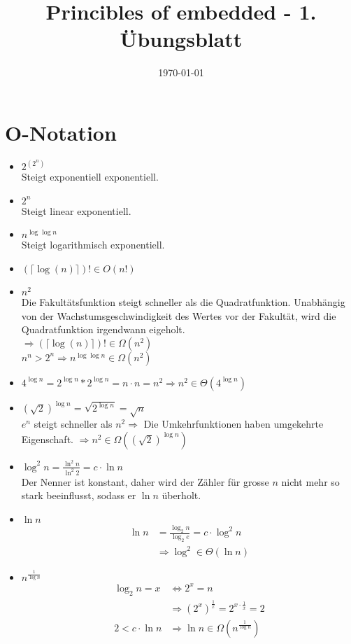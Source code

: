 \documentclass[a4paper,10pt]{scrartcl}
\title{Princibles of embedded  - 1. \"Ubungsblatt}
\author{\Authors}
\date{\today}
\begin{document}
\maketitle

\section{$\boldsymbol{O}$-Notation}
\begin{itemize}
	\item $2^{(2^n)}$\\
		Steigt exponentiell exponentiell.
	\item $2^n$\\
		Steigt linear exponentiell.
	\item $n^{\log \log n}$\\
		Steigt logarithmisch exponentiell.
	\item $(\lceil \log (n) \rceil )! \in O(n!)$
	\item $n^2$\\
		Die Fakult\"atsfunktion steigt schneller als die Quadratfunktion. Unabh\"angig von der Wachstumsgeschwindigkeit des Wertes vor der Fakult\"at, wird die Quadratfunktion irgendwann eigeholt.\\
		$\Rightarrow  (\lceil \log (n) \rceil )! \in \Omega(n^2)$\\
		$n^n > 2^n \Rightarrow n^{\log \log n} \in \Omega(n^2)$
	\item $4^{\log n} = 2^{\log n} * 2^{\log n} = n \cdot n = n^2 \Rightarrow n^2 \in \Theta(4^{\log n})$\\
	\item $(\sqrt{2})^{\log n} = \sqrt{2^{\log n}} = \sqrt{n}$\\
		$e^{n}$ steigt schneller als $n^2 \Rightarrow$ Die Umkehrfunktionen haben umgekehrte Eigenschaft. $\Rightarrow n^2 \in \Omega((\sqrt{2})^{\log n})$
	\item $\log^2 n = \frac{\ln^2 n}{\ln^2 2} = c \cdot \ln n$\\
		Der Nenner ist konstant, daher wird der Z\"ahler f\"ur grosse $n$ nicht mehr so stark beeinflusst, sodass er $\ln n$ \"uberholt.
	\item $\ln n$\\
		\begin{align*}
		\ln n &= \frac{\log_2 n}{\log_2 e} = c \cdot \log^2 n\\
		&\Rightarrow \log^2 \in \Theta(\ln n)
		\end{align*}
	\item $n^{\frac{1}{\log n}}$
		\begin{align*}
		\log_2 n = x &\Leftrightarrow 2^x = n\\
		&\Rightarrow (2^x)^{\frac{1}{x}} = 2^{x \cdot \frac{1}{x}} = 2 \tag{Konstant} \\
		2 < c \cdot \ln n &\Rightarrow \ln n \in \Omega(n^{\frac{1}{\log n}})
		\end{align*}
\end{itemize}
\end{document}
